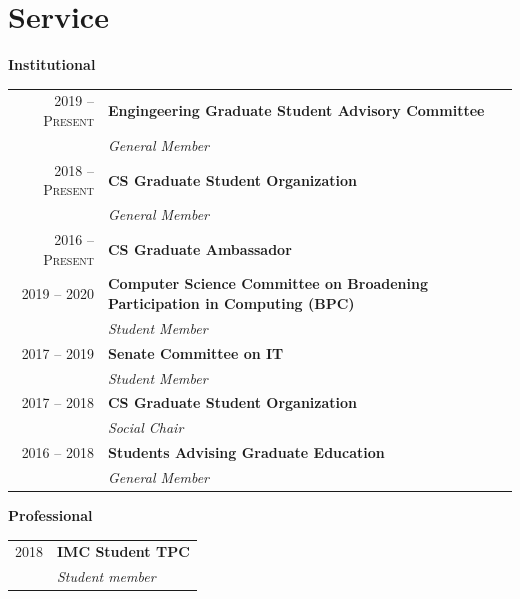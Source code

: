 \documentclass[10pt,singlecolumn]{article} %
\begin{document}
\section{Service}

\textbf{Institutional}\\

\begin{tabular}{rl}

2019 -- \textsc{Present} & \textbf{Engingeering Graduate Student Advisory Committee}\\
& \emph{General Member} \\

2018 -- \textsc{Present} & \textbf{CS Graduate Student Organization}\\
& \emph{General Member} \\

2016 -- \textsc{Present} & \textbf{CS Graduate Ambassador}\\

2019 -- 2020 & \textbf{Computer Science Committee on Broadening Participation in Computing (BPC)} \\
& \emph{Student Member} \\

2017 -- 2019 & \textbf{Senate Committee on IT} \\
& \emph{Student Member} \\

2017 -- 2018 & \textbf{CS Graduate Student Organization}\\
& \emph{Social Chair} \\

2016 -- 2018 & \textbf{Students Advising Graduate Education}\\
& \emph{General Member} \\

\end{tabular} 

\vspace{0.3cm}
\textbf{Professional}\\

\begin{tabular}{rl}
2018 & \textbf{IMC Student TPC} \\
& \emph{Student member}\\
\end{tabular} \\

\end{document}
